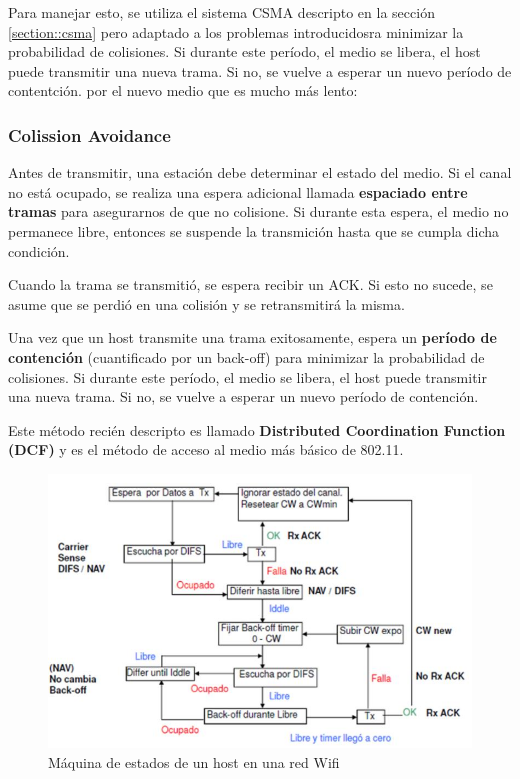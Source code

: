 Para manejar esto, se utiliza el sistema CSMA descripto en la sección \ref{section::csma} pero adaptado a los problemas introducidosra minimizar la probabilidad de colisiones. Si durante este período, el medio se libera, el host puede transmitir una nueva trama. Si no, se vuelve a esperar un nuevo período de contentción. por el nuevo medio que es mucho más lento:

\subsubsection*{Colission Avoidance}
Antes de transmitir, una estación debe determinar el estado del medio. Si el canal no está ocupado, se realiza una espera adicional llamada \textbf{espaciado entre tramas} para asegurarnos de que no colisione.  Si durante esta espera, el medio no permanece libre, entonces se suspende la transmición hasta que se cumpla dicha condición.

Cuando la trama se transmitió, se espera recibir un ACK. Si esto no sucede, se asume que se perdió en una colisión y se retransmitirá la misma. 

Una vez que un host transmite una trama exitosamente, espera un \textbf{período de contención} (cuantificado por un back-off) para minimizar la probabilidad de colisiones. Si durante este período, el medio se libera, el host puede transmitir una nueva trama. Si no, se vuelve a esperar un nuevo período de contención.

Este método recién descripto es llamado \textbf{Distributed Coordination Function (DCF)} y es el método de acceso al medio más básico de 802.11.


\begin{figure}[H]
	\centering
	\includegraphics[width=\textwidth
]{images/wifi-estados.jpg}
	\caption[Máquina de estados de un host en una red Wifi]{Máquina de estados de un host en una red Wifi}
	\label{fig:wifi-estados}
\end{figure}

